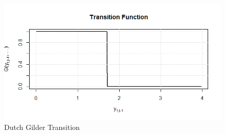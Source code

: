 \begin{figure}
\centering
\includegraphics[scale=0.2]{fx_trans}
\caption{Dutch Gilder Transition}
\label{fig:transition}
\end{figure}

